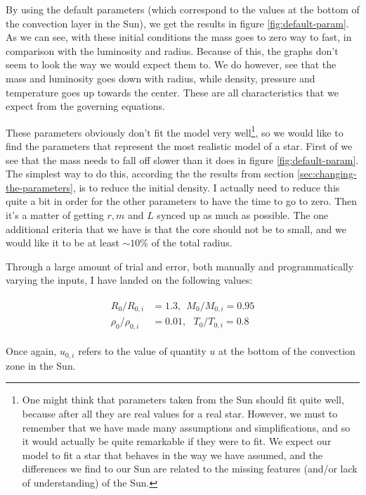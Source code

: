 \documentclass[11pt,twocolumn]{article}
\begin{document}
By using the default parameters (which correspond to the values at the
bottom of the convection layer in the Sun), we get the results in
figure \ref{fig:default-param}. As we can see, with these initial
conditions the mass goes to zero way to fast, in comparison with the
luminosity and radius. Because of this, the graphs don't seem to look
the way we would expect them to. We do however, see that the mass and
luminosity goes down with radius, while density, pressure and
temperature goes up towards the center. These are all characteristics
that we expect from the governing equations.

These parameters obviously don't fit the model very well\footnote{One
  might think that parameters taken from the Sun should fit quite
  well, because after all they are real values for a real
  star. However, we must to remember that we have made many
  assumptions and simplifications, and so it would actually be quite
  remarkable if they were to fit. We expect our model to fit a star
  that behaves in the way we have assumed, and the differences we find
to our Sun are related to the missing features (and/or lack of
understanding) of the Sun.}, so we would like to find the parameters
that represent the most realistic model of a star. First of we see
that the mass needs to fall off slower than it does in figure
\ref{fig:default-param}. The simplest way to do this, according the
the results from section \ref{sec:changing-the-parameters}, is to reduce the initial density. I actually
need to reduce this quite a bit in order for the other parameters to
have the time to go to zero. Then it's a matter of getting $r,m$ and
$L$ synced up as much as possible. The one additional criteria that we
have is that the core should not be to small, and we would like it to
be at least $\sim 10\%$ of the total radius. 

Through a large amount of trial and error, both manually and programmatically varying the inputs, I
have landed on the following values:

\begin{align}
\begin{split}
  R_0/R_{0,i} &= 1.3, \ \ M_0/M_{0,i}= 0.95\\ 
  \rho_0/\rho_{0,i} &= 0.01,\ \ \    T_0/T_{0,i} = 0.8
\end{split}
\end{align}

Once again, $u_{0,i}$ refers to the value of quantity $u$ at the
bottom of the convection zone in the Sun.
\end{document}
